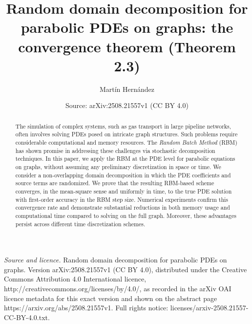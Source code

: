 \documentclass[10pt,a4paper]{amsart}
\title[Random domain decomposition for parabolic PDEs on graphs]{Random domain decomposition for parabolic PDEs on graphs: the convergence theorem (Theorem 2.3)}
\author[Mart\'in Hern\'andez]{Mart\'in Hern\'andez}
\date{Source: arXiv:2508.21557v1 (CC BY 4.0)}
\begin{document}
\begin{abstract}
The simulation of complex systems, such as gas transport in large pipeline networks, often involves solving PDEs posed on intricate graph structures. Such problems require considerable computational and memory resources. The \emph{Random Batch Method} (RBM) has shown promise in addressing these challenges via stochastic decomposition techniques. In this paper, we apply the RBM at the PDE level for parabolic equations on graphs, {without assuming any preliminary discretization in space or time}. We consider a non-overlapping domain decomposition in which the PDE coefficients and source terms are randomized. We prove that the resulting RBM-based scheme converges, in the mean-square sense and uniformly in time, to the true PDE solution with first-order accuracy in the RBM step size. Numerical experiments confirm this convergence rate and demonstrate substantial reductions in both memory usage and computational time compared to solving on the full graph. Moreover, these advantages persist across different time discretization schemes.
\end{abstract}
\maketitle

\noindent\emph{Source and licence.} Random domain decomposition for parabolic PDEs on graphs. Version arXiv:2508.21557v1 (CC BY 4.0), distributed under the Creative Commons Attribution 4.0 International licence, http://creativecommons.org/licenses/by/4.0/, as recorded in the arXiv OAI licence metadata for this exact version and shown on the abstract page https://arxiv.org/abs/2508.21557v1. Full rights notice: licenses/arxiv-2508.21557-CC-BY-4.0.txt.\par\smallskip
\end{document}

